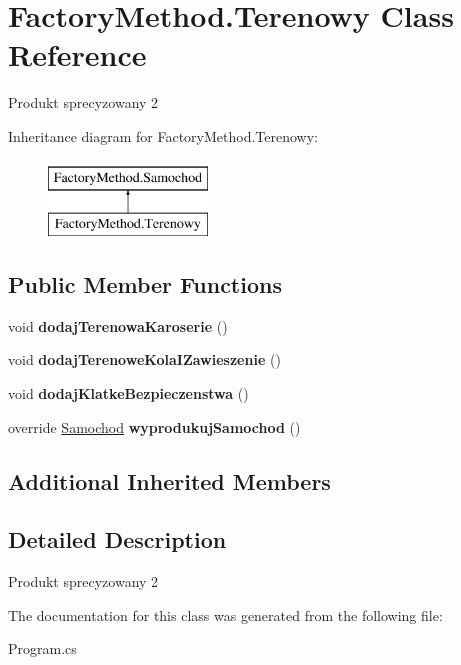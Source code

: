 \hypertarget{class_factory_method_1_1_terenowy}{}\section{Factory\+Method.\+Terenowy Class Reference}
\label{class_factory_method_1_1_terenowy}


Produkt sprecyzowany 2  


Inheritance diagram for Factory\+Method.\+Terenowy\+:\begin{figure}[H]
\begin{center}
\leavevmode
\includegraphics[height=2.000000cm]{class_factory_method_1_1_terenowy}
\end{center}
\end{figure}
\subsection*{Public Member Functions}
\begin{DoxyCompactItemize}
\item 
\mbox{\label{class_factory_method_1_1_terenowy_ad80ba1863ae92a25a1dadd0786b82559}} 
void {\bfseries dodaj\+Terenowa\+Karoserie} ()
\item 
\mbox{\label{class_factory_method_1_1_terenowy_ab619040153b6cdee28be46600372e68b}} 
void {\bfseries dodaj\+Terenowe\+Kola\+I\+Zawieszenie} ()
\item 
\mbox{\label{class_factory_method_1_1_terenowy_af5a53d1c35602a406a3fcf25377b9ca2}} 
void {\bfseries dodaj\+Klatke\+Bezpieczenstwa} ()
\item 
\mbox{\label{class_factory_method_1_1_terenowy_a1ad06aaedf23b482a2258fba6da31315}} 
override \hyperlink{class_factory_method_1_1_samochod}{Samochod} {\bfseries wyprodukuj\+Samochod} ()
\end{DoxyCompactItemize}
\subsection*{Additional Inherited Members}


\subsection{Detailed Description}
Produkt sprecyzowany 2 



The documentation for this class was generated from the following file\+:\begin{DoxyCompactItemize}
\item 
Program.\+cs\end{DoxyCompactItemize}
